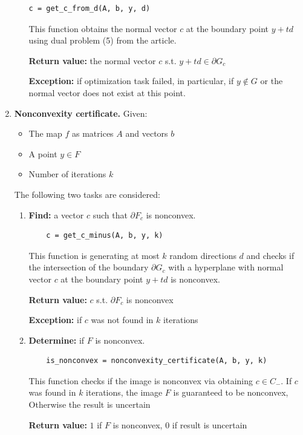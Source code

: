 \documentclass[a4paper]{article}
\theoremstyle{definition}
\begin{document}
\begin{enumerate}
\begin{enumerate}
\begin{verbatim}
c = get_c_from_d(A, b, y, d)
\end{verbatim}

This function obtains the normal vector $c$ at the boundary point $y+td$ using dual problem (5) from the article.

{\bf Return value:} the normal vector $c$ s.t. $y+td\in\partial G_c$

{\bf Exception:} if optimization task failed, in particular, if $y\notin G$ or the normal vector does not exist at this point.
\end{enumerate}

\item {\bf Nonconvexity certificate.} Given:
\begin{itemize}
	\item The map $f$ as matrices $A$ and vectors $b$
	\item A point $y\in F$
	\item Number of iterations $k$
\end{itemize}
The following two tasks are considered:
\begin{enumerate}
	\item {\bf Find:} a vector $c$ such that $\partial F_c$ is nonconvex.
	
	\begin{verbatim}
	c = get_c_minus(A, b, y, k)
	\end{verbatim}
	This function is generating at most $k$ random directions $d$ and checks if the intersection of the boundary $\partial G_c$ with a hyperplane with normal vector $c$ at the boundary point $y+td$ is nonconvex.

	{\bf Return value:}  $c$ s.t. $\partial F_c$ is nonconvex
	
	{\bf Exception:} if $c$ was not found in $k$ iterations
	
	\item {\bf Determine:} if $F$ is nonconvex.
	
	\begin{verbatim}
	is_nonconvex = nonconvexity_certificate(A, b, y, k)
	\end{verbatim}
	
	This function checks if the image is nonconvex via obtaining $c\in C_-$. If $c$ was found in $k$ iterations, the image $F$ is guaranteed to be nonconvex, Otherwise the result is uncertain
	
	{\bf Return value:} $1$ if $F$ is nonconvex, $0$ if result is uncertain
\end{enumerate}


\end{enumerate}
\end{document}
